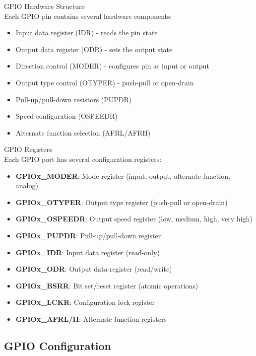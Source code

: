 \begin{concept}{GPIO Hardware Structure}\\
Each GPIO pin contains several hardware components:
\begin{itemize}
    \item Input data register (IDR) - reads the pin state
    \item Output data register (ODR) - sets the output state
    \item Direction control (MODER) - configures pin as input or output
    \item Output type control (OTYPER) - push-pull or open-drain
    \item Pull-up/pull-down resistors (PUPDR)
    \item Speed configuration (OSPEEDR)
    \item Alternate function selection (AFRL/AFRH)
\end{itemize}
\end{concept}

\begin{definition}{GPIO Registers}\\
Each GPIO port has several configuration registers:
\begin{itemize}
    \item \textbf{GPIOx\_MODER}: Mode register (input, output, alternate function, analog)
    \item \textbf{GPIOx\_OTYPER}: Output type register (push-pull or open-drain)
    \item \textbf{GPIOx\_OSPEEDR}: Output speed register (low, medium, high, very high)
    \item \textbf{GPIOx\_PUPDR}: Pull-up/pull-down register
    \item \textbf{GPIOx\_IDR}: Input data register (read-only)
    \item \textbf{GPIOx\_ODR}: Output data register (read/write)
    \item \textbf{GPIOx\_BSRR}: Bit set/reset register (atomic operations)
    \item \textbf{GPIOx\_LCKR}: Configuration lock register
    \item \textbf{GPIOx\_AFRL/H}: Alternate function registers
\end{itemize}
\end{definition}

\subsection{GPIO Configuration}

